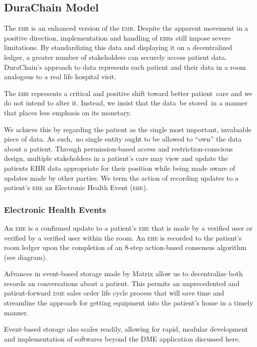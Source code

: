 \subsection{DuraChain Model}
The \textsc{ehr} is an enhanced version of the \textsc{emr}. Despite the apparent movement in a positive direction, implementation and handling of \textsc{ehr}s still impose severe limitations.\cite{palmaEHR} By standardizing this data and displaying it on a decentralized ledger, a greater number of stakeholders can securely access patient data. DuraChain’s approach to data represents each patient and their data in a room analogous to a real life hospital visit.%

The \textsc{ehr} represents a critical and positive shift toward better patient care and we do not intend to alter it. Instead, we insist that the data be stored in a manner that places less emphasis on its monetary.%

We achieve this by regarding the patient as the single most important, invaluable piece of data. As such, no single entity ought to be allowed to ``own'' the data about a patient. Through permission-based access and restriction-conscious design, multiple stakeholders in a patient’s care may view and update the patients EHR data appropriate for their position while being made aware of updates made by other parties. We term the action of recording updates to a patient’s \textsc{ehe} an Electronic Health Event (\textsc{ehe}).%

  \subsubsection{Electronic Health Events}

  An \textsc{ehe} is a confirmed update to a patient's \textsc{ehe} that is made by a verified user or verified by a verified user within the room. An \textsc{ehe} is recorded to the patient’s room ledger upon the completion of an 8-step action-based consensus algorithm (see diagram).%

  Advances in event-based storage made by Matrix allow us to decentralize both records an conversations about a patient. This permits an unprecedented and patient-forward \textsc{dme} sales order life cycle process that will save time and streamline the approach for getting equipment into the patient's home in a timely manner.%

  Event-based storage also scales readily, allowing for rapid, modular development and implementation of softwares beyond the DME application discussed here.%

